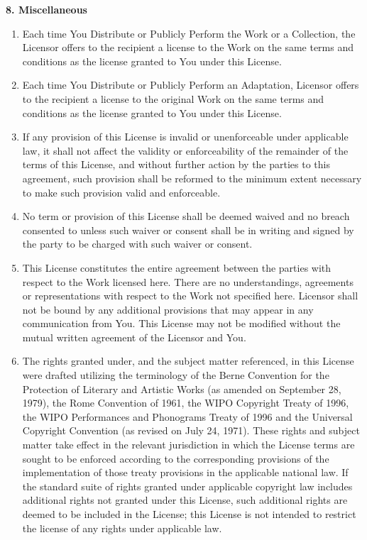     \noindent \textbf{8. Miscellaneous}
    
    \begin{enumerate}[noitemsep,label=\alph*.]
      
      \item Each time You Distribute or Publicly Perform the Work or a Collection, the Licensor offers to the recipient a license to the Work on the same terms and conditions as the license granted to You under this License.
      
      \item Each time You Distribute or Publicly Perform an Adaptation, Licensor offers to the recipient a license to the original Work on the same terms and conditions as the license granted to You under this License.
      
      \item If any provision of this License is invalid or unenforceable under applicable law, it shall not affect the validity or enforceability of the remainder of the terms of this License, and without further action by the parties to this agreement, such provision shall be reformed to the minimum extent necessary to make such provision valid and enforceable.
      
      \item No term or provision of this License shall be deemed waived and no breach consented to unless such waiver or consent shall be in writing and signed by the party to be charged with such waiver or consent.
      
      \item This License constitutes the entire agreement between the parties with respect to the Work licensed here. There are no understandings, agreements or representations with respect to the Work not specified here. Licensor shall not be bound by any additional provisions that may appear in any communication from You. This License may not be modified without the mutual written agreement of the Licensor and You.
      
      \item The rights granted under, and the subject matter referenced, in this License were drafted utilizing the terminology of the Berne Convention for the Protection of Literary and Artistic Works (as amended on September 28, 1979), the Rome Convention of 1961, the WIPO Copyright Treaty of 1996, the WIPO Performances and Phonograms Treaty of 1996 and the Universal Copyright Convention (as revised on July 24, 1971). These rights and subject matter take effect in the relevant jurisdiction in which the License terms are sought to be enforced according to the corresponding provisions of the implementation of those treaty provisions in the applicable national law. If the standard suite of rights granted under applicable copyright law includes additional rights not granted under this License, such additional rights are deemed to be included in the License; this License is not intended to restrict the license of any rights under applicable law.
      
    \end{enumerate}
  
  \endgroup
  
